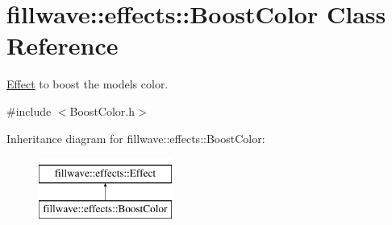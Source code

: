 \hypertarget{classfillwave_1_1effects_1_1BoostColor}{}\section{fillwave\+:\+:effects\+:\+:Boost\+Color Class Reference}
\label{classfillwave_1_1effects_1_1BoostColor}


\hyperlink{classfillwave_1_1effects_1_1Effect}{Effect} to boost the models color.  




{\ttfamily \#include $<$Boost\+Color.\+h$>$}

Inheritance diagram for fillwave\+:\+:effects\+:\+:Boost\+Color\+:\begin{figure}[H]
\begin{center}
\leavevmode
\includegraphics[height=2.000000cm]{classfillwave_1_1effects_1_1BoostColor}
\end{center}
\end{figure}
